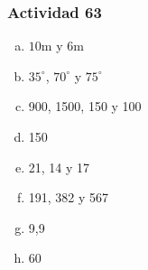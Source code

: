 \documentclass[a4paper, twocolumn]{article}
\begin{document}
\subsubsection*{Actividad 63}
\begin{enumerate}[a)]
\item $10\mathrm{m}$ y $6\mathrm{m}$
\item $35^\circ$, $70^\circ$ y $75^\circ$
\item 900, 1500, 150 y 100
\item 150
\item 21, 14 y 17
\item 191, 382 y 567
\item 9,9
\item 60
\end{enumerate}



\end{document}

